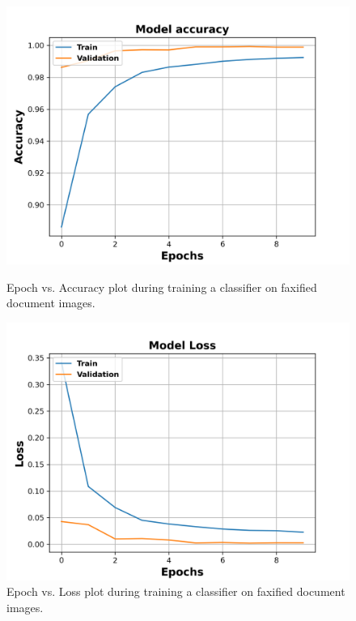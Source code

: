 \vspace*{1.5cm}
\begin{figure}[H]
  \centering
  \begin{minipage}[b]{0.49\textwidth}
    \includegraphics[width=\textwidth]{images/Evaluation/Faxified_Data_Classifier_2021-05-31_19-31-35_Accuracy.png}
    \caption[Epoch vs. Accuracy plot during training a classifier on faxified document images.]{Epoch vs. Accuracy plot during training a classifier on  faxified document images.}
    \label{fig:FaxifiedClassifierAcc}
  \end{minipage}
  \hfill
  \begin{minipage}[b]{0.49\textwidth}
    \includegraphics[width=\textwidth]{images/Evaluation/Faxified_Data_Classifier_2021-05-31_19-31-35_Loss.png}
    \caption[Epoch vs. Loss plot during training a classifier on faxified document images.]{Epoch vs. Loss plot during training a classifier on faxified document images.}
    \label{fig:FaxifiedClassifierLoss}
  \end{minipage}
\end{figure}



